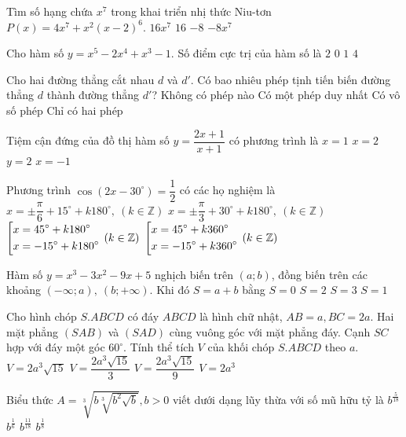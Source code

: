 \begin{ex}%
Tìm số hạng chứa $x^7$ trong khai triển nhị thức Niu-tơn $P(x)=4x^7+x^2(x-2)^6$.
\choice
{$16x^7$}
{$16$}
{$-8$}
{\True $-8x^7$}
\end{ex}
\begin{ex}%
Cho hàm số $y=x^5-2x^4+x^3-1$. Số điểm cực trị của hàm số là
\choice
{\True $2$}
{$0$}
{$1$}
{$4$}
\end{ex}
\begin{ex}%
Cho hai đường thẳng cắt nhau $d$ và $d'$. Có bao nhiêu phép tịnh tiến biến đường thẳng $d$ thành đường thẳng $d'$?
\choice
{\True Không có phép nào}
{Có một phép duy nhất}
{Có vô số phép}
{Chỉ có hai phép}
\end{ex}
\begin{ex}%
Tiệm cận đứng của đồ thị hàm số $y=\dfrac{2x+1}{x+1}$ có phương trình là
\choice
{$x=1$}
{$x=2$}
{$y=2$}
{\True $x=-1$}
\end{ex}
\begin{ex}%
Phương trình $\cos \left(2x-30^\circ\right)=\dfrac{1}{2}$ có các họ nghiệm là
\choice
{$x=\pm\dfrac{\pi}{6}+15^\circ+k180^\circ,\ (k\in\mathbb{Z})$}
{$x=\pm\dfrac{\pi}{3}+30^\circ+k180^\circ,\ (k\in\mathbb{Z})$}
{\True $\left[\begin{aligned}&x=45^\circ+k180^\circ\\&x=-15^\circ+k180^\circ\end{aligned}\right.\, (k\in\mathbb{Z})$}
{$\left[\begin{aligned}&x=45^\circ+k360^\circ\\&x=-15^\circ+k360^\circ\end{aligned}\right.\, (k\in\mathbb{Z})$}
\end{ex}
\begin{ex}%
Hàm số $y=x^3-3x^2-9x+5$ nghịch biến trên $(a;b)$, đồng biến trên các khoảng $(-\infty;a),\ (b;+\infty)$. Khi đó $S=a+b$ bằng
\choice
{$S=0$}
{\True $S=2$}
{$S=3$}
{$S=1$}
\end{ex}
\begin{ex}%
Cho hình chóp $S.ABCD$ có đáy $ABCD$ là hình chữ nhật, $AB=a,BC=2a$. Hai mặt phẳng $(SAB)$ và $(SAD)$ cùng vuông góc với mặt phẳng đáy. Cạnh $SC$ hợp với đáy một góc $60^\circ$. Tính thể tích $V$ của khối chóp $S.ABCD$ theo $a$.
\choice
{$V=2a^3\sqrt{15}$}
{\True $V=\dfrac{2a^3\sqrt{15}}{3}$}
{$V=\dfrac{2a^3\sqrt{15}}{9}$}
{$V=2a^3$}
\end{ex}
\begin{ex}%
Biểu thức $A=\displaystyle\sqrt[3]{b\sqrt[3]{b^2\sqrt{b}}}, b>0$ viết dưới dạng lũy thừa với số mũ hữu tỷ là
\choice
{$\displaystyle b^\frac{5}{18}$}
{$\displaystyle b^\frac{1}{6}$}
{\True $\displaystyle b^\frac{11}{18}$}
{$\displaystyle b^\frac{1}{8}$}
\end{ex}
